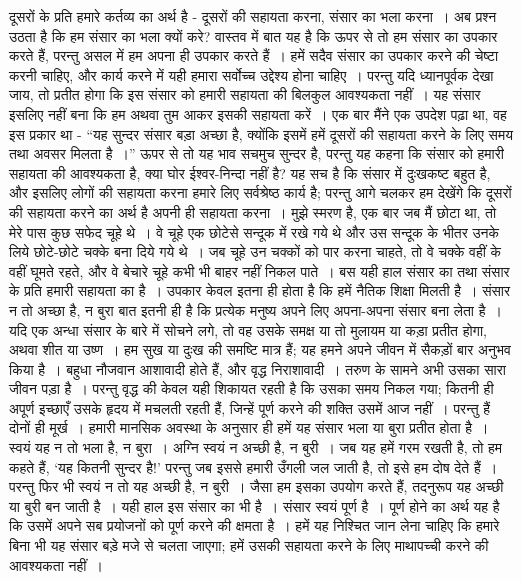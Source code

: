 दूसरों के प्रति हमारे कर्तव्य का अर्थ है - दूसरों की सहायता करना, संसार का भला करना~। अब प्रश्न उठता है कि हम संसार का भला क्यों करे? वास्तव में बात यह है कि ऊपर से तो हम संसार का उपकार करते हैं, परन्तु असल में हम अपना ही उपकार करते हैं~। हमें सदैव संसार का उपकार करने की चेष्टा करनी चाहिए, और कार्य करने में यही हमारा सर्वोच्च उद्देश्य होना चाहिए~। परन्तु यदि ध्यानपूर्वक देखा जाय, तो प्रतीत होगा कि इस संसार को हमारी सहायता की बिलकुल आवश्यकता नहीं~। यह संसार इसलिए नहीं बना कि हम अथवा तुम आकर इसकी सहायता करें~। एक बार मैंने एक उपदेश पढ़ा था, वह इस प्रकार था - “यह सुन्दर संसार बड़ा अच्छा है, क्योंकि इसमें हमें दूसरों की सहायता करने के लिए समय तथा अवसर मिलता है~।” ऊपर से तो यह भाव सचमुच सुन्दर है, परन्तु यह कहना कि संसार को हमारी सहायता की आवश्यकता है, क्या घोर ईश्वर-निन्दा नहीं है? यह सच है कि संसार में दुःखकष्ट बहुत है, और इसलिए लोगों की सहायता करना हमारे लिए सर्वश्रेष्ठ कार्य है; परन्तु आगे चलकर हम देखेंगे कि दूसरों की सहायता करने का अर्थ है अपनी ही सहायता करना~। मुझे स्मरण है, एक बार जब मैं छोटा था, तो मेरे पास कुछ सफेद चूहे थे~। वे चूहे एक छोटेसे सन्दूक में रखे गये थे और उस सन्दूक के भीतर उनके लिये छोटे-छोटे चक्के बना दिये गये थे~। जब चूहे उन चक्कों को पार करना चाहते, तो वे चक्के वहीं के वहीं घूमते रहते, और वे बेचारे चूहे कभी भी बाहर नहीं निकल पाते~। बस यही हाल संसार का तथा संसार के प्रति हमारी सहायता का है~। उपकार केवल इतना ही होता है कि हमें नैतिक शिक्षा मिलती है~। संसार न तो अच्छा है, न बुरा बात इतनी ही है कि प्रत्येक मनुष्य अपने लिए अपना-अपना संसार बना लेता है~। यदि एक अन्धा संसार के बारे में सोचने लगे, तो वह उसके समक्ष या तो मुलायम या कड़ा प्रतीत होगा, अथवा शीत या उष्ण~। हम सुख या दुःख की समष्टि मात्र हैं; यह हमने अपने जीवन में सैकड़ों बार अनुभव किया है~। बहुधा नौजवान आशावादी होते हैं, और वृद्ध निराशावादी~। तरुण के सामने अभी उसका सारा जीवन पड़ा है~। परन्तु वृद्ध की केवल यही शिकायत रहती है कि उसका समय निकल गया; कितनी ही अपूर्ण इच्छाएँ उसके हृदय में मचलती रहती हैं, जिन्हें पूर्ण करने की शक्ति उसमें आज नहीं~। परन्तु हैं दोनों ही मूर्ख~। हमारी मानसिक अवस्था के अनुसार ही हमें यह संसार भला या बुरा प्रतीत होता है~। स्वयं यह न तो भला है, न बुरा~। अग्नि स्वयं न अच्छी है, न बुरी~। जब यह हमें गरम रखती है, तो हम कहते हैं, ‘यह कितनी सुन्दर है!’ परन्तु जब इससे हमारी उँगली जल जाती है, तो इसे हम दोष देते हैं~। परन्तु फिर भी स्वयं न तो यह अच्छी है, न बुरी~। जैसा हम इसका उपयोग करते हैं, तदनुरूप यह अच्छी या बुरी बन जाती है~। यही हाल इस संसार का भी है~। संसार स्वयं पूर्ण है~। पूर्ण होने का अर्थ यह है कि उसमें अपने सब प्रयोजनों को पूर्ण करने की क्षमता है~। हमें यह निश्चित जान लेना चाहिए कि हमारे बिना भी यह संसार बड़े मजे से चलता जाएगा; हमें उसकी सहायता करने के लिए माथापच्ची करने की आवश्यकता नहीं~।

